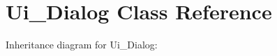 \hypertarget{classUi__Dialog}{}\section{Ui\+\_\+\+Dialog Class Reference}
\label{classUi__Dialog}


Inheritance diagram for Ui\+\_\+\+Dialog\+:
